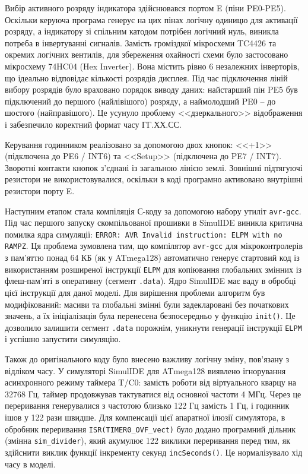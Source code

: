 \documentclass[14pt, a4paper]{extreport}
\begin{document}
	Вибір активного розряду індикатора здійснювався портом E (піни PE0-PE5). Оскільки керуюча програма генерує на цих пінах логічну одиницю для активації розряду, а індикатору зі спільним катодом потрібен логічний нуль, виникла потреба в інвертуванні сигналів. Замість громіздкої мікросхеми TC4426 та окремих логічних вентилів, для збереження охайності схеми було застосовано мікросхему 74HC04 (Hex Inverter). Вона містить рівно 6 незалежних інверторів, що ідеально відповідає кількості розрядів дисплея. Під час підключення ліній вибору розрядів було враховано порядок виводу даних: найстарший пін PE5 був підключений до першого (найлівішого) розряду, а наймолодший PE0 -- до шостого (найправішого). Це усунуло проблему <<дзеркального>> відображення і забезпечило коректний формат часу ГГ.ХХ.СС.
	
	Керування годинником реалізовано за допомогою двох кнопок: <<+1>> (підключена до PE6 / INT6) та <<Setup>> (підключена до PE7 / INT7). Зворотні контакти кнопок з'єднані із загальною лінією землі. Зовнішні підтягуючі резистори не використовувалися, оскільки в коді програмно активовано внутрішні резистори порту E.
	
	Наступним етапом стала компіляція С-коду за допомогою набору утиліт \texttt{avr-gcc}. Під час першого запуску скомпільованої прошивки в SimulIDE виникла критична помилка ядра симуляції: \texttt{ERROR: AVR Invalid instruction: ELPM with no RAMPZ}. Ця проблема зумовлена тим, що компілятор \texttt{avr-gcc} для мікроконтролерів з пам'яттю понад 64 КБ (як у ATmega128) автоматично генерує стартовий код із використанням розширеної інструкції \texttt{ELPM} для копіювання глобальних змінних із флеш-пам'яті в оперативну (сегмент \texttt{.data}). Ядро SimulIDE має ваду в обробці цієї інструкції для даної моделі. Для вирішення проблеми алгоритм був модифікований: масиви та глобальні змінні були задекларовані без початкових значень, а їх ініціалізація була перенесена безпосередньо у функцію \texttt{init()}. Це дозволило залишити сегмент \texttt{.data} порожнім, уникнути генерації інструкції \texttt{ELPM} і успішно запустити симуляцію.
	
	
	Також до оригінального коду було внесено важливу логічну зміну, пов'язану з відліком часу. У симуляторі SimulIDE для ATmega128 виявлено ігнорування асинхронного режиму таймера T/C0: замість роботи від віртуального кварцу на 32768 Гц, таймер продовжував тактуватися від основної частоти 4 МГц. Через це переривання генерувалися з частотою близько 122 Гц замість 1 Гц, і годинник ішов у 122 рази швидше. Для компенсації цієї апаратної ілюзії симулятора, в обробник переривання \texttt{ISR(TIMER0\_OVF\_vect)} було додано програмний дільник (змінна \texttt{sim\_divider}), який акумулює 122 виклики переривання перед тим, як здійснити виклик функції інкременту секунд \texttt{incSeconds()}. Це нормалізувало хід часу в моделі.
	
\end{document}
